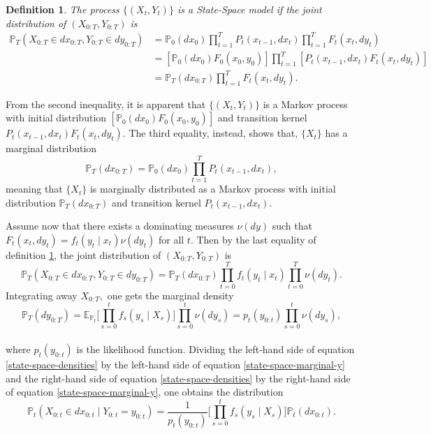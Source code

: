 \documentclass[
]{book}
\theoremstyle{break}
\newtheorem{definition}{Definition}
\theoremstyle{nonumberplain}
\begin{document}
\begin{definition}\label{state-space-def}
The process $\{(X_t,Y_t)\}$ is a State-Space model if the joint distribution of $(X_{0:T},Y_{0:T})$ is 
\begin{align*}
  \mathbb{P}_T(X_{0:T}\in dx_{0:T},Y_{0:T}\in dy_{0:T}) &= \mathbb{P}_0(dx_0)\prod\limits_{t=1}^T P_t(x_{t-1},dx_t)\prod\limits_{t=1}^T F_t(x_t,dy_t)\\
  &= [\mathbb{P}_0(dx_0)F_0(x_0,y_0)]\prod\limits_{t=1}^T[P_t(x_{t-1},dx_t)F_t(x_t,dy_t)] \\
  &= \mathbb{P}_T(dx_{0:T})\prod \limits_{t=1}^T F_t(x_t,dy_t).
\end{align*}
\end{definition}

From the second inequality, it is apparent that \(\{(X_t,Y_t)\}\) is a
Markov process with initial distribution
\([\mathbb{P}_0(dx_0)F_0(x_0,y_0)]\) and transition kernel
\(P_t(x_{t-1},dx_t)F_t(x_t,dy_t).\) The third equality, instead, shows
that, \(\{X_t\}\) has a marginal distribution
\[\mathbb{P}_T(dx_{0:T})=\mathbb{P}_0(dx_0)\prod_{t=1}^T P_t(x_{t-1},dx_t),\]
meaning that \(\{X_t\}\) is marginally distributed as a Markov process
with initial distribution \(\mathbb{P}_T(dx_{0:T})\) and transition
kernel \(P_t(x_{t-1},dx_t).\)

Assume now that there exists a dominating measures \(\nu(dy)\) such that
\(F_t(x_t,dy_t)=f_t(y_t\mid x_t)\nu(dy_t)\) for all \(t.\) Then by the
last equality of definition \ref{state-space-def}, the joint
distribution of \((X_{0:T},Y_{0:T})\) is
\begin{equation}\label{state-space-densities}
   \mathbb{P}_T(X_{0:T}\in dx_{0:T},Y_{0:T}\in dy_{0:T})=\mathbb{P}_T(dx_{0:T})\prod\limits_{t=0}^T f_t(y_t\mid x_t)\prod\limits_{t=0}^T\nu(dy_t).
\end{equation} Integrating away \(X_{0:T},\) one gets the marginal
density \begin{equation}\label{state-space-marginal-y}
  \mathbb{P}_T(dy_{0:T}) = \mathbb E_{\mathbb{P}_{t}}\big[\prod\limits_{s=0}^t f_s(y_s\mid X_s) \big] \prod\limits_{s=0}^t\nu(dy_s)
                = p_t(y_{0:t})\prod\limits_{s=0}^t\nu(dy_s),
\end{equation}\\
where \(p_t(y_{0:t})\) is the likelihood function. Dividing the
left-hand side of equation \ref{state-space-densities} by the left-hand
side of equation \ref{state-space-marginal-y} and the right-hand side of
equation \ref{state-space-densities} by the right-hand side of equation
\ref{state-space-marginal-y}, one obtains the distribution
\begin{equation}
\mathbb{P}_t(X_{0:t}\in dx_{0:t}\mid Y_{0:t}=y_{0:t})=\frac{1}{p_t(y_{0:t})}\big[\prod\limits_{s=0}^t f_s(y_s\mid X_s) \big]\mathbb{P}_t(dx_{0:t}).
\end{equation}
\end{document}
